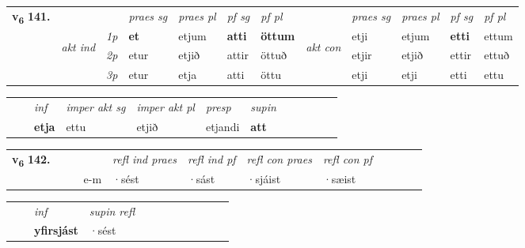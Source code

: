 \begin{tabular}{llllllllllll} \toprule
\multirow{4}{*}{{{\textbf{v{\textsubscript{6}}} \Large{\textbf{141.}}}}}  & &   &  \textit{praes sg}  & \textit{praes pl}  &\textit{ pf sg} & \textit{pf pl} &  &  \textit{praes sg}  & \textit{praes pl}  & \textit{pf sg} & \textit{pf pl } \\*
	\cmidrule{4-7} \cmidrule{9-12}
 & \multirow{3}{*}{\begin{turn}{90}\textit{akt ind}\end{turn}} & {\textit{1p}} & \textbf{et} & etjum    & \textbf{atti} & \textbf{öttum} & \multirow{3}{*}{\begin{turn}{90}\textit{akt con}\end{turn}} &etji & etjum & \textbf{etti} & ettum\\*
& &  {\textit{2p}} &  etur  & etjið   & attir & öttuð & & etjir & etjið & ettir & ettuð \\*
& &  {\textit{3p}} & etur & etja   & atti & öttu & & etji & etji& etti & ettu  \\*
\cmidrule{4-7} \cmidrule{9-12}
\end{tabular}


\begin{tabular}{llllllllllll}
 & & \textit{inf} & \textit{imper akt sg} & \textit{imper akt pl}   & \textit{presp} & \textit{supin}       \\*
  & & \textbf{etja} & ettu  & etjið   & etjandi &  \textbf{att}   \\*
\cmidrule{1-12}
\end{tabular}





\begin{tabular}{llllllllllll}\toprule
\multirow{4}{*}{{{\textbf{v{\textsubscript{6}}} \Large{\textbf{142.}}}}}  & &  & &  \textit{refl ind praes} & \textit{refl ind pf} & \textit{refl con praes} & \textit{refl con pf} \\*
&  & & e-m & ·sést & ·sást & ·sjáist & ·sæist \\*
\cmidrule{5-9}
\end{tabular}


\begin{tabular}{llllllllllll}
 & & \textit{inf}       & \textit{supin refl}      \\*
  & & \textbf{yfirsjást}        & ·sést  \\*
\cmidrule{1-12}
\end{tabular}



